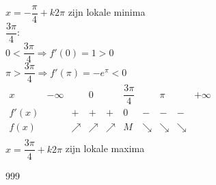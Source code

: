 \documentclass[a4paper]{article}
\begin{document}
$x = -\dfrac{\pi}{4} + k2\pi$ zijn lokale minima \\

$\dfrac{3\pi}{4}$: \\

$0 < \dfrac{3\pi}{4} \Rightarrow f'(0) = 1 > 0$ \\

$\pi > \dfrac{3\pi}{4} \Rightarrow f'(\pi) = -e^{\pi} < 0$ \\

$\begin{array}{r|ccccccccc}
x     & -\infty &          & 0        &          & \dfrac{3\pi}{4} &          & \pi      &          & +\infty \\ 
\hline
f'(x) &         & +        & +        & +        & 0               & -        & -        & -        &\\ 
f(x)  &         & \nearrow & \nearrow & \nearrow & M               & \searrow & \searrow & \searrow &\\
\end{array}$ \\

$x = \dfrac{3\pi}{4} + k2\pi$ zijn lokale maxima \\



\begin{thebibliography}{999}
\end{thebibliography}
\end{document}
